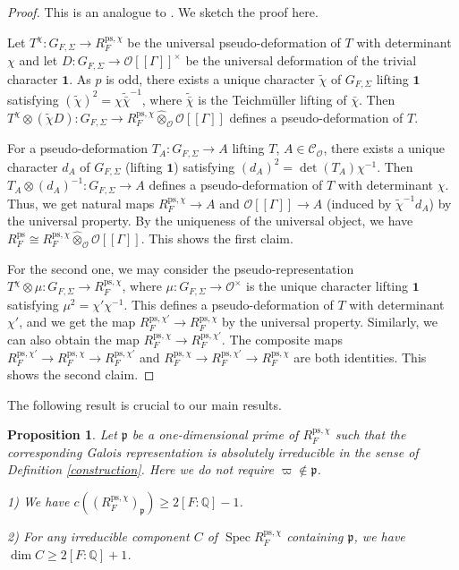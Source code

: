 \documentclass[a4paper, 12pt]{amsart}
\newtheorem{prop}[thm]{Proposition}
\DeclareMathOperator{\Spec}{Spec}
\def\ps{\mathrm{ps}}
\newcommand{\Q}{\mathbb{Q}}
\newcommand{\cO}{\mathcal{O}}
\newcommand{\kp}{\mathfrak{p}}
\begin{document}
	\begin{proof}
		This is an analogue to \cite[Lemma 6.1.2]{Allen_2019}. We sketch the proof here.
		
		Let $T^\chi: G_{F, \Sigma} \to R_{F}^{\ps, \chi}$ be the universal pseudo-deformation of $T$ with determinant $\chi$ and let $D: G_{F, \Sigma} \to \cO[[\Gamma]]^\times $ be the universal deformation of the trivial character $\mathbf{1}$. As $p$ is odd, there exists a unique character $\tilde{\chi}$ of $G_{F, \Sigma}$ lifting $\mathbf{1}$ satisfying $(\tilde{\chi})^2=\chi\tilde{\bar{\chi}}^{-1}$, where $ \tilde{\bar{\chi}}$ is the Teichm\"uller lifting of $ \bar{\chi}$. Then $T^\chi \otimes (\tilde{\chi}D): G_{F, \Sigma} \to R_{F}^{\ps, \chi} \widehat{\otimes}_\cO \cO[[\Gamma]]$ defines a pseudo-deformation of $T$.
		
		For a pseudo-deformation $T_A: G_{F, \Sigma} \to A$ lifting $T$, $A \in \mathcal{C}_{\mathcal{O}}$, there exists a unique character $d_A$ of $G_{F, \Sigma}$ (lifting $\mathbf{1}$) satisfying $(d_A)^2= \det(T_A)\chi^{-1}$. Then $T_A \otimes (d_A)^{-1} : G_{F, \Sigma} \to A$ defines a pseudo-deformation of $T$ with determinant $\chi$. Thus, we get natural maps $R_{F}^{\ps, \chi} \to A $ and $ \cO[[\Gamma]] \to A$ (induced by $\tilde{\chi}^{-1}d_A$) by the universal property. By the uniqueness of the universal object, we have  $R_{F}^{\ps} \cong R_{F}^{\ps, \chi} \widehat{\otimes}_\cO \cO[[\Gamma]] $. This shows the first claim.
		
		For the second one, we may consider the pseudo-representation $ T^\chi \otimes \mu : G_{F, \Sigma} \to R_{F}^{\ps, \chi}$, where $\mu : G_{F, \Sigma} \to \cO^\times$ is the unique character lifting $\mathbf{1}$ satisfying $\mu^2 = \chi'\chi^{-1}$. This defines a pseudo-deformation of $T$ with determinant $\chi'$, and we get the map $ R_{F}^{\ps, \chi'} \to R_{F}^{\ps, \chi}$ by the universal property. Similarly, we can also obtain the map $ R_{F}^{\ps, \chi} \to R_{F}^{\ps, \chi'}$. The composite maps $R_{F}^{\ps, \chi'} \to R_{F}^{\ps, \chi} \to R_{F}^{\ps, \chi'} $ and $R_{F}^{\ps, \chi} \to R_{F}^{\ps, \chi'} \to R_{F}^{\ps, \chi} $ are both identities. This shows the second claim.
		
			\end{proof}
	
	The following result is crucial to our main results.
	
	\begin{prop}\label{irreducible point}
		Let $\kp$ be a one-dimensional prime of $ R_{F}^{\ps, \chi}$ such that the corresponding Galois representation is absolutely irreducible in the sense of Definition \ref{construction}. Here we do not require $\varpi \notin \kp$.
		
	   1)	 We have $c((R_{F}^{\ps, \chi})_{\kp}) \ge 2[F: \Q]-1$.
		
		2) For any irreducible component $C$ of $ \Spec R_{F}^{\ps, \chi}$ containing $\kp$, we have $\dim C \ge 2[F:\Q]+1$.
	\end{prop}
	
\end{document}
